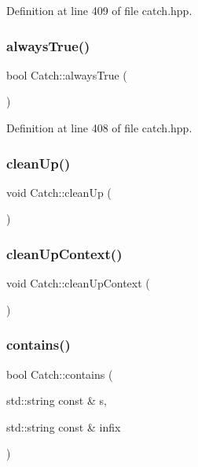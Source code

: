Definition at line 409 of file catch.\+hpp.

\hypertarget{namespace_catch_a129be2186a2f6546206ec52c4bf2156f}{}\label{namespace_catch_a129be2186a2f6546206ec52c4bf2156f} 
\subsubsection{\texorpdfstring{always\+True()}{alwaysTrue()}}
{\footnotesize\ttfamily bool Catch\+::always\+True (\begin{DoxyParamCaption}{ }\end{DoxyParamCaption})\hspace{0.3cm}{\ttfamily [inline]}}



Definition at line 408 of file catch.\+hpp.

\hypertarget{namespace_catch_a0f78e9afdebc6d4512d18e76fbf54b8c}{}\label{namespace_catch_a0f78e9afdebc6d4512d18e76fbf54b8c} 
\subsubsection{\texorpdfstring{clean\+Up()}{cleanUp()}}
{\footnotesize\ttfamily void Catch\+::clean\+Up (\begin{DoxyParamCaption}{ }\end{DoxyParamCaption})}

\hypertarget{namespace_catch_ae50508f10ffc4ed873a31a4db4caea16}{}\label{namespace_catch_ae50508f10ffc4ed873a31a4db4caea16} 
\subsubsection{\texorpdfstring{clean\+Up\+Context()}{cleanUpContext()}}
{\footnotesize\ttfamily void Catch\+::clean\+Up\+Context (\begin{DoxyParamCaption}{ }\end{DoxyParamCaption})}

\hypertarget{namespace_catch_aa52974b0e426e7e2fbd725a900e9c36e}{}\label{namespace_catch_aa52974b0e426e7e2fbd725a900e9c36e} 
\subsubsection{\texorpdfstring{contains()}{contains()}}
{\footnotesize\ttfamily bool Catch\+::contains (\begin{DoxyParamCaption}\item[{std\+::string const \&}]{s,  }\item[{std\+::string const \&}]{infix }\end{DoxyParamCaption})}

